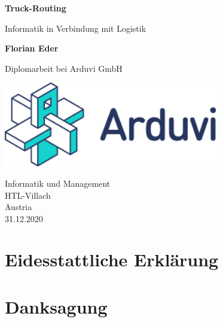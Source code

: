 \documentclass[12pt]{report}
\begin{document}
\begin{titlepage}
    \begin{center}
        \vspace*{1cm}
            
        \Huge
        \textbf{Truck-Routing}
            
        \vspace{0.5cm}
        \LARGE
        Informatik in Verbindung mit Logistik
            
        \vspace{1.5cm}
            
        \textbf{Florian Eder}
            
        \vspace{2.5cm}
            
        Diplomarbeit bei Arduvi GmbH
            
        \vspace{0.8cm}
            
        \includegraphics[width=0.7\textwidth]{ArduviLogoWithText.png}
        
        \vspace{0.8cm}

        \Large
        Informatik und Management\\
        HTL-Villach\\
        Austria\\
        31.12.2020
            
    \end{center}
\end{titlepage}

    \chapter*{Eidesstattliche Erklärung}
    

    \chapter*{Danksagung}
    
\end{document}
